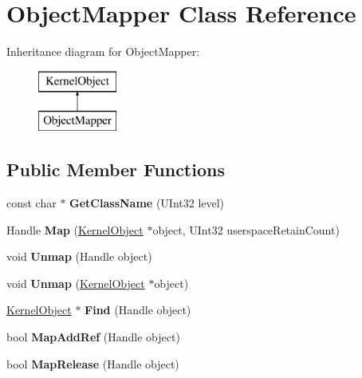 \hypertarget{class_object_mapper}{}\section{Object\+Mapper Class Reference}
\label{class_object_mapper}
Inheritance diagram for Object\+Mapper\+:\begin{figure}[H]
\begin{center}
\leavevmode
\includegraphics[height=2.000000cm]{class_object_mapper}
\end{center}
\end{figure}
\subsection*{Public Member Functions}
\begin{DoxyCompactItemize}
\item 
\mbox{\label{class_object_mapper_a195f3551b2c5217a735a355ea755258c}} 
const char $\ast$ {\bfseries Get\+Class\+Name} (U\+Int32 level)
\item 
\mbox{\label{class_object_mapper_adb790e7f63a3973f9d78ca92ab495729}} 
Handle {\bfseries Map} (\hyperlink{class_kernel_object}{Kernel\+Object} $\ast$object, U\+Int32 userspace\+Retain\+Count)
\item 
\mbox{\label{class_object_mapper_afdc3bff77408aed2c3e8dd735e6980da}} 
void {\bfseries Unmap} (Handle object)
\item 
\mbox{\label{class_object_mapper_a579a59aea26ddd3ade5147b97d4c99ec}} 
void {\bfseries Unmap} (\hyperlink{class_kernel_object}{Kernel\+Object} $\ast$object)
\item 
\mbox{\label{class_object_mapper_af0ff19c2675951a5b501cd3258148ace}} 
\hyperlink{class_kernel_object}{Kernel\+Object} $\ast$ {\bfseries Find} (Handle object)
\item 
\mbox{\label{class_object_mapper_a886841000f1cd09814827455fb14f508}} 
bool {\bfseries Map\+Add\+Ref} (Handle object)
\item 
\mbox{\label{class_object_mapper_acf86dc599ab75b601100cb0d557e6bda}} 
bool {\bfseries Map\+Release} (Handle object)
\end{DoxyCompactItemize}
